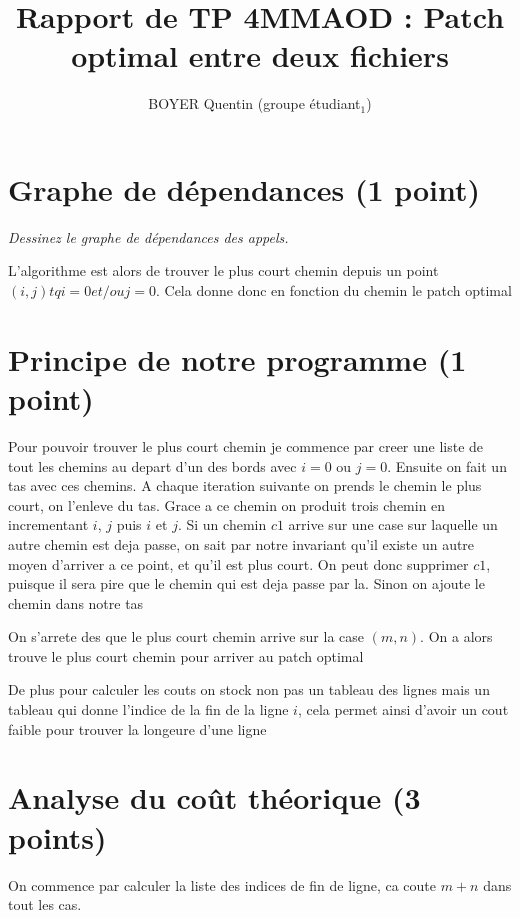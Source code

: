 \documentclass[a4paper,10pt,french]{article}
\title{Rapport de TP 4MMAOD : Patch optimal entre deux fichiers}
\author{
	BOYER Quentin (groupe étudiant$_1$)
}
\begin{document}
\maketitle

\section{Graphe de dépendances (1 point)}
{\em Dessinez le graphe de dépendances des appels.}

{L'algorithme est alors de trouver le plus court chemin depuis un point $(i,j) tq i=0 et/ou j=0$. Cela donne donc en fonction du chemin le patch optimal}

\section{Principe de notre  programme (1 point)}
{
	Pour pouvoir trouver le plus court chemin je commence par creer une liste de tout les chemins au depart d'un des bords avec $i=0$ ou $j=0$. Ensuite on fait un tas avec ces chemins. A chaque iteration suivante on prends le chemin le plus court, on l'enleve du tas. Grace a ce chemin on produit trois chemin en incrementant $i$, $j$ puis $i$ et $j$.
	Si un chemin $c1$ arrive sur une case sur laquelle un autre chemin est deja passe, on sait par notre invariant qu'il existe un autre moyen d'arriver a ce point, et qu'il est plus court. On peut donc supprimer $c1$, puisque il sera pire que le chemin qui est deja passe par la.
	Sinon on ajoute le chemin dans notre tas

	On s'arrete des que le plus court chemin arrive sur la case $(m,n)$. On a alors trouve le plus court chemin pour arriver au patch optimal
	
	De plus pour calculer les couts on stock non pas un tableau des lignes mais un tableau qui donne l'indice de la fin de la ligne $i$, cela permet ainsi d'avoir un cout faible pour trouver la longeure d'une ligne
}

\section{Analyse du coût théorique (3 points)}
{
	On commence par calculer la liste des indices de fin de ligne, ca coute $m+n$ dans tout les cas.
}
\end{document}
